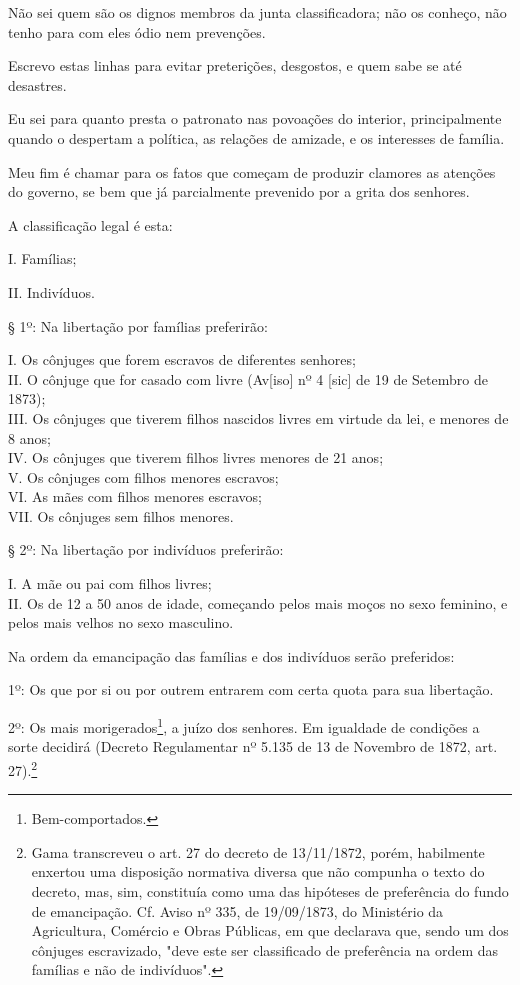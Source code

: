 Não sei quem são os dignos membros da junta classificadora; não os
conheço, não tenho para com eles ódio nem prevenções.

Escrevo estas linhas para evitar preterições, desgostos, e quem sabe se
até desastres.

Eu sei para quanto presta o patronato nas povoações do interior,
principalmente quando o despertam a política, as relações de amizade, e
os interesses de família.

Meu fim é chamar para os fatos que começam de produzir clamores as
atenções do governo, se bem que já parcialmente prevenido por a grita
dos senhores.

A classificação legal é esta:

I. Famílias;

II. Indivíduos.

§ 1º: Na libertação por famílias preferirão:

I. Os cônjuges que forem escravos de diferentes senhores;\\
II. O cônjuge que for casado com livre (Av{[}iso{]} nº 4 {[}sic{]} de 19
de Setembro de 1873);\\
III. Os cônjuges que tiverem filhos nascidos livres em virtude da lei, e
menores de 8 anos;\\
IV. Os cônjuges que tiverem filhos livres menores de 21 anos;\\
V. Os cônjuges com filhos menores escravos;\\
VI. As mães com filhos menores escravos;\\
VII. Os cônjuges sem filhos menores.

§ 2º: Na libertação por indivíduos preferirão:

I. A mãe ou pai com filhos livres;\\
II. Os de 12 a 50 anos de idade, começando pelos mais moços no sexo
feminino, e pelos mais velhos no sexo masculino.

Na ordem da emancipação das famílias e dos indivíduos serão preferidos:

1º: Os que por si ou por outrem entrarem com certa quota para sua
libertação.

2º: Os mais morigerados\footnote{Bem-comportados.}, a juízo dos
senhores. Em igualdade de condições a sorte decidirá (Decreto
Regulamentar nº 5.135 de 13 de Novembro de 1872, art. 27).\footnote{
  Gama transcreveu o art. 27 do decreto de 13/11/1872, porém, habilmente
  enxertou uma disposição normativa diversa que não compunha o texto do
  decreto, mas, sim, constituía como uma das hipóteses de preferência do
  fundo de emancipação. Cf. Aviso nº 335, de 19/09/1873, do Ministério
  da Agricultura, Comércio e Obras Públicas, em que declarava que, sendo
  um dos cônjuges escravizado, "deve este ser classificado de
  preferência na ordem das famílias e não de indivíduos".}

